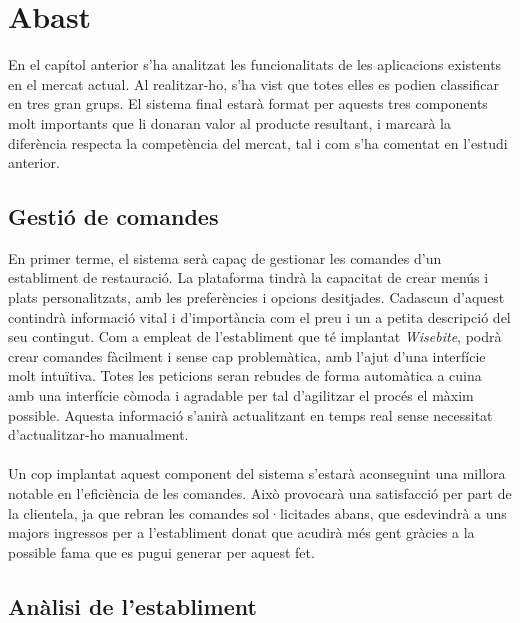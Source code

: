 
\section{Abast}

En el capítol anterior s'ha analitzat les funcionalitats de les aplicacions existents en el mercat actual. Al realitzar-ho, s'ha vist que totes elles es podien classificar en tres gran grups. El sistema final estarà format per aquests tres components molt importants que li donaran valor al producte resultant, i marcarà la diferència respecta la competència del mercat, tal i com s'ha comentat en l'estudi anterior.

\subsection{Gestió de comandes}

En primer terme, el sistema serà capaç de gestionar les comandes d'un establiment de restauració. La plataforma tindrà la capacitat de crear menús i plats personalitzats, amb les preferències i opcions desitjades. Cadascun d'aquest contindrà informació vital i d'importància com el preu i un a petita descripció del seu contingut. Com a empleat de l'establiment que té implantat \textit{Wisebite}, podrà crear comandes fàcilment i sense cap problemàtica, amb l'ajut d'una interfície molt intuïtiva. Totes les peticions seran rebudes de forma automàtica a cuina amb una interfície còmoda i agradable per tal d'agilitzar el procés el màxim possible. Aquesta informació s'anirà actualitzant en temps real sense necessitat d'actualitzar-ho manualment.
\\\\
Un cop implantat aquest component del sistema s'estarà aconseguint una millora notable en l'eficiència de les comandes. Això provocarà una satisfacció per part de la clientela, ja que rebran les comandes sol·licitades abans, que esdevindrà a uns majors ingressos per a l'establiment donat que acudirà més gent gràcies a la possible fama que es pugui generar per aquest fet.

\subsection{Anàlisi de l'establiment}

